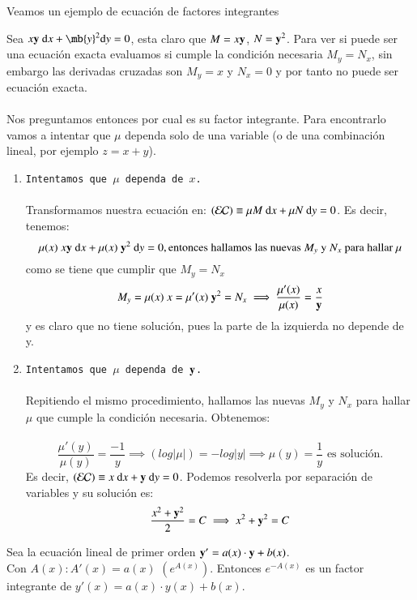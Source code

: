 Veamos un ejemplo de ecuación de factores integrantes
\begin{eg}
    Sea $x\mbf{y}\ \d x + \mb{y}^2 \d y = 0$, esta claro que $M = x\mathbf{y}$, $N = \mathbf{y}^2$. Para ver si puede ser una ecuación exacta evaluamos si cumple la condición necesaria $M_y = N_x$, sin embargo las derivadas cruzadas son $M_y=x$ y $N_x = 0$ y por tanto no puede ser ecuación exacta.\\\\
    Nos preguntamos entonces por cual es su factor integrante. Para encontrarlo vamos a intentar que $\mu$ dependa solo de una variable (o de una combinación lineal, por ejemplo $z = x+y$).\\
    \begin{enumerate}
        \item \texttt{Intentamos que $\mu$ dependa de $x$.}\\\\
            Transformamos nuestra ecuación en: $(\mathcal{EC})\equiv \mu M\ \mathrm{d} x + \mu N\ \mathrm{d} y = 0$. Es decir, tenemos:
            $$
                \mu(x)\ x\mbf{y}\  \d x + \mu(x)\ \mbf{y}^2\ \d y = 0, \text{entonces hallamos las nuevas $M_y$ y $N_x$ para hallar $\mu$}
            $$
            como se tiene que cumplir que $M_y = N_x$
            $$
                M_y = \mu(x)\ x = \mu'(x)\ \mathbf{y}^2 = N_x \implies \frac{\mu'(x)}{\mu(x)} = \frac{x}{\mathbf{y}}
            $$
            y es claro que no tiene solución, pues la parte de la izquierda no depende de y.
        \item \texttt{Intentamos que $\mu$ dependa de $\mathbf{y}$.}\\\\
        Repitiendo el mismo procedimiento, hallamos las nuevas $M_y$ y $N_x$ para hallar $\mu$ que cumple la condición necesaria. Obtenemos:\\\\
        $$
            \frac{\mu'(y)}{\mu(y)} = \frac{-1}{y} \implies (log |\mu|) = -log |y| \implies \mu(y) = \frac{1}{y} \text{ es solución}.
        $$
        Es decir, $(\mathcal{EC}) \equiv x\ \mathrm{d} x + \mathbf{y}\ \mathrm{d} y = 0$. Podemos resolverla por separación de variables y su solución es:
        $$
            \frac{x^2+\mathbf{y}^2}{2} = C \implies x^2+\mathbf{y}^2 = C
        $$
    \end{enumerate}
\end{eg}

\begin{obs}
    Sea la ecuación lineal de primer orden $\mathbf{y}' = a(x) \cdot \mathbf{y} + b(x)$.\\
    Con $A(x) : A'(x) = a(x)$ $(e^{A(x)})$. %
    Entonces $e^{-A(x)}$ es un factor integrante de $y'(x) = a(x) \cdot y(x) + b(x)$.
\end{obs}

